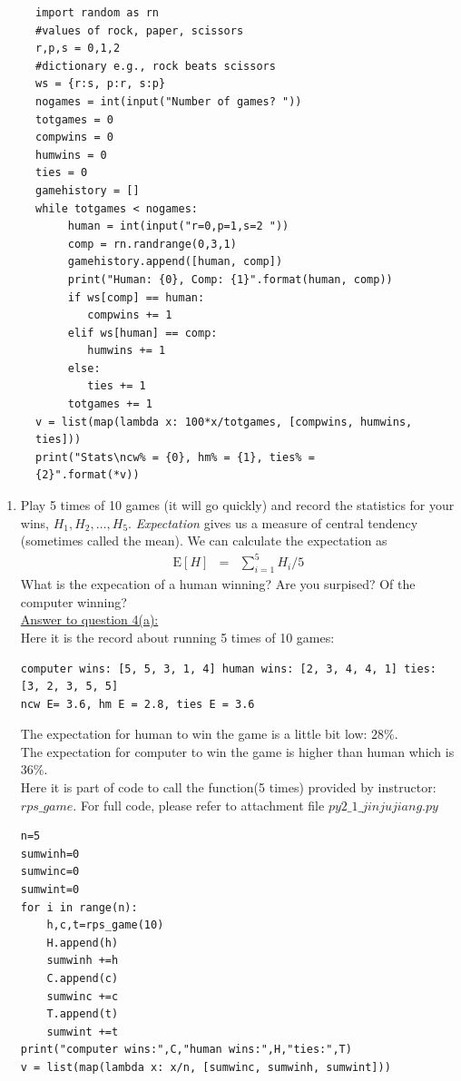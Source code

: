 \documentclass{article}
\begin{document}
\begin{enumerate}
\begin{figure}[h]
{\small
\begin{verbatim}
import random as rn
#values of rock, paper, scissors
r,p,s = 0,1,2
#dictionary e.g., rock beats scissors
ws = {r:s, p:r, s:p}
nogames = int(input("Number of games? "))
totgames = 0
compwins = 0
humwins = 0
ties = 0
gamehistory = []
while totgames < nogames:
     human = int(input("r=0,p=1,s=2 "))
     comp = rn.randrange(0,3,1)
     gamehistory.append([human, comp])
     print("Human: {0}, Comp: {1}".format(human, comp))
     if ws[comp] == human:
        compwins += 1
     elif ws[human] == comp:
        humwins += 1
     else:
        ties += 1
     totgames += 1
v = list(map(lambda x: 100*x/totgames, [compwins, humwins, ties]))
print("Stats\ncw% = {0}, hm% = {1}, ties% = {2}".format(*v))
\end{verbatim}}
\end{figure}
\begin{enumerate}
\item Play 5 times of 10 games (it will go quickly) and record the statistics for your wins, $H_1, H_2, \ldots, H_5$.   {\it Expectation} gives us a measure of central tendency (sometimes called the mean).  We can calculate the expectation as
\begin{eqnarray*}
\mathrm{E}[H] &=& \sum_{i=1}^5 H_i/5
\end{eqnarray*}
What is the expecation of a human winning? Are you surpised? Of the computer winning?\\
\underline{Answer to question 4(a):}\\
Here it is the record about running 5 times of 10 games:
\begin{verbatim}
computer wins: [5, 5, 3, 1, 4] human wins: [2, 3, 4, 4, 1] ties: [3, 2, 3, 5, 5]
ncw E= 3.6, hm E = 2.8, ties E = 3.6
\end{verbatim}
The expectation for human to win the game is a little bit low: $28\%$.\\
The expectation for computer to win the game is higher than human which is $36\%$.\\
Here it is part of code to call the function(5 times) provided by instructor:$rps\_game$. For full code, please refer to attachment file $py2\_1\_jinjujiang.py$
\begin{verbatim}
n=5
sumwinh=0
sumwinc=0
sumwint=0
for i in range(n):
    h,c,t=rps_game(10)
    H.append(h)
    sumwinh +=h
    C.append(c)
    sumwinc +=c
    T.append(t)
    sumwint +=t
print("computer wins:",C,"human wins:",H,"ties:",T)
v = list(map(lambda x: x/n, [sumwinc, sumwinh, sumwint]))

\end{verbatim}
\end{enumerate}
\end{enumerate}
\end{document}
